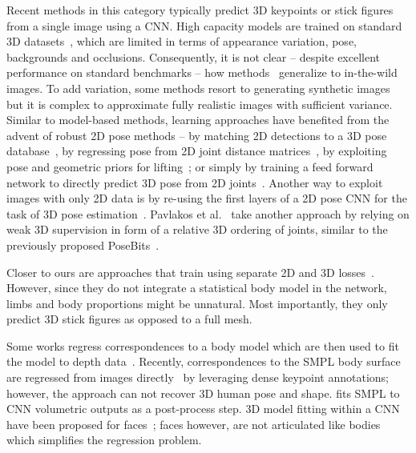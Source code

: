 \documentclass[10pt,twocolumn,letterpaper]{article}
\begin{document}
 Recent methods in this category typically
predict 3D keypoints or stick figures from a single image using a CNN.
High capacity models are trained on standard 3D
datasets~\cite{ionescu_human36_pami14,sigal_humaneva_ijcv10}, which are limited
in terms of appearance variation, pose, backgrounds and occlusions.
Consequently, it is not clear -- despite excellent performance on standard
benchmarks --
how methods~\cite{tekin_structured_bmvc16,li_accv14,pavlakos_volumetric_cvpr17,li_maximum_iccv2015}
generalize to in-the-wild images. To add variation, some methods resort to generating synthetic 
images ~\cite{rogez_mocap_nips16,varol17,Lassner:GP:2017} but it is complex to approximate 
fully realistic images with sufficient variance.
Similar to model-based methods, learning approaches have benefited from the
advent of robust 2D pose methods -- by matching 2D detections to a 3D pose
database~\cite{chen_2d_match_cvpr17,yasin_dual_source_cvpr16}, by regressing
pose from 2D joint distance matrices~\cite{moreno_distance_matrix_cvpr17}, by
exploiting pose and geometric priors for
lifting~\cite{zhou_sparseness_deepness_cvpr15,akhter_pose_conditioned_cvpr15,simo_joint_CVPR2013,Jahangiri2017,mehta2017single,zhou2018monocap,rogez2018lcr};
or simply by training a feed forward network to directly predict 3D pose from 2D
joints~\cite{martinez20173dbaseline}. Another way to exploit images with only 2D
data is by re-using the first layers of a 2D pose CNN for the task of 3D pose
estimation~\cite{tekin_fusion_arxiv16,VNect_SIGGRAPH2017,mehta_mono_3dv17}. Pavlakos et al.~\cite{pavlakos2018ordinal} take another approach by relying on weak 3D supervision in form of a relative 3D ordering of joints, similar to the previously proposed PoseBits~\cite{posebits_cvpr14}.

Closer to ours are approaches that train using separate 2D and 3D
losses~\cite{popa2017deep,zhou2017towards,sun2017compositional}. 
However, since they do not integrate a statistical
body model in the network, limbs and body proportions might be
unnatural. Most importantly, they only predict 3D stick
figures as opposed to a full mesh.

Some works regress correspondences to a body model which are then used to fit the model to depth data~\cite{pons2015metric,taylor2012vitruvian}. 
Recently, correspondences to the SMPL body surface are regressed from images directly~\cite{guler2018densepose} by leveraging dense keypoint annotations; 
however, the approach can not recover 3D human pose and shape. \cite{varol2018bodynet} fits SMPL to CNN volumetric outputs as a post-process step.
3D model fitting within a CNN have been proposed for faces~\cite{tewari2017mofa}; faces however, are not articulated like bodies which simplifies the regression problem.
\end{document}
